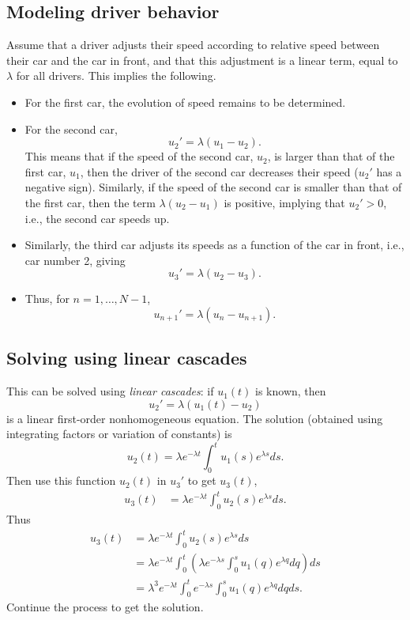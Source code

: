 \subsection{Modeling driver behavior}
Assume that a driver adjusts their speed according to relative speed between their car and the car in front, and that this adjustment is a linear term, equal to $\lambda$ for all drivers. This implies the following.
\begin{itemize}
\item
For the first car, the evolution of speed remains to be determined.
\item 
For the second car,
\[
u_2'=\lambda(u_1-u_2).
\]
This means that if the speed of the second car, $u_2$, is larger than that of the first car, $u_1$, then the driver of the second car decreases their speed ($u_2'$ has a negative sign). Similarly, if the speed of the second car is smaller than that of the first car, then the term $\lambda(u_2-u_1)$ is positive, implying that $u_2'>0$, i.e., the second car speeds up.
\item
Similarly, the third car adjusts its speeds as a function of the car in front, i.e., car number 2, giving
\[
u_3'=\lambda(u_2-u_3).
\]
\item 
Thus, for $n=1,\ldots,N-1$,
\begin{equation}\label{eq:ode_traffic_flow}
u_{n+1}'=\lambda(u_n-u_{n+1}).
\end{equation}
\end{itemize}

\subsection{Solving using linear cascades}
This can be solved using \emph{linear cascades}: if $u_1(t)$ is known, then
\[
u_2'=\lambda(u_1(t)-u_2)
\]
is a linear first-order nonhomogeneous equation. The solution (obtained using integrating factors or variation of constants) is
\[
u_2(t)=\lambda e^{-\lambda t}\int_0^t u_1(s)e^{\lambda s}ds.
\]
Then use this function $u_2(t)$ in $u_3'$ to get $u_3(t)$,
\begin{align*}
u_3(t) &= \lambda e^{-\lambda t}\int_0^t u_2(s)e^{\lambda s}ds.
\end{align*}
Thus
\begin{align*}
u_3(t) &= \lambda e^{-\lambda t}\int_0^t u_2(s)e^{\lambda s}ds \\
&= \lambda e^{-\lambda t}\int_0^t 
\left(\lambda e^{-\lambda s}\int_0^s u_1(q)e^{\lambda q}dq\right)ds \\
&= \lambda^3 e^{-\lambda t}\int_0^t e^{-\lambda s}\int_0^s u_1(q)e^{\lambda q}dqds.
\end{align*}
Continue the process to get the solution.

